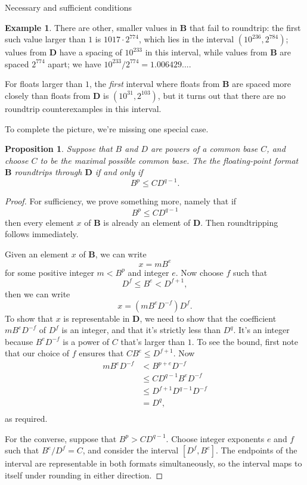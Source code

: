 \documentclass{article}
\theoremstyle{plain}
\newtheorem{proposition}[lemma]{Proposition}
\theoremstyle{definition}
\newtheorem{example}[lemma]{Example}
\begin{document}
\begin{section}{Necessary and sufficient conditions}
\begin{example}
  There are other, smaller values in $\mathbf B$ that fail to roundtrip: the
  first such value larger than $1$ is $1017\cdot 2^{774}$, which lies in the
  interval $(10^{236}, 2^{784})$; values from $\mathbf D$ have a spacing of
  $10^{233}$ in this interval, while values from $\mathbf B$ are spaced
  $2^{774}$ apart; we have $10^{233} / 2^{774} = 1.006429...$.

  For floats larger than $1$, the \emph{first} interval where floats from
  $\mathbf B$ are spaced more closely than floats from $\mathbf D$ is
  $(10^{31}, 2^{103})$, but it turns out that there are no roundtrip
  counterexamples in this interval.
\end{example}

To complete the picture, we're missing one special case.

\begin{proposition}
  Suppose that $B$ and $D$ are powers of a common base $C$, and choose $C$ to
  be the maximal possible common base. The the floating-point format $\mathbf
  B$ roundtrips through $\mathbf D$ if and only if
  $$B^p \le C D^{q-1}.$$
\end{proposition}

\begin{proof}
  For sufficiency, we prove something more, namely that if $$B^p \le C
  D^{q-1}$$ then every element $x$ of $\mathbf B$ is already an element of
  $\mathbf D$. Then roundtripping follows immediately.

  Given an element $x$ of $\mathbf B$, we can write
  $$x = mB^e$$
  for some positive integer $m < B^p$ and integer $e$. Now choose $f$ such
  that
  $$D^f \le B^e < D^{f+1},$$ then we can write $$x = (mB^eD^{-f})D^f.$$ To show
  that $x$ is representable in $\mathbf D$, we need to show that the
  coefficient $mB^eD^{-f}$ of $D^f$ is an integer, and that it's strictly less
  than $D^q$. It's an integer because $B^eD^{-f}$ is a power of $C$ that's
  larger than $1$. To see the bound, first note that our choice of $f$ ensures
  that $CB^e \le D^{f+1}$. Now
  \begin{align*}
    mB^eD^{-f}
    & < B^{p+e}D^{-f} \\
    & \le CD^{q-1}B^eD^{-f} \\
    & \le D^{f+1}D^{q-1}D^{-f} \\
    & = D^q,\\
  \end{align*}
  as required.

  For the converse, suppose that $B^p > CD^{q-1}$. Choose integer exponents $e$
  and $f$ such that $B^e / D^f = C$, and consider the interval $[D^f,
    B^e]$. The endpoints of the interval are representable in both formats
  simultaneously, so the interval maps to itself under rounding in either
  direction.


\end{proof}
\end{section}
\end{document}
